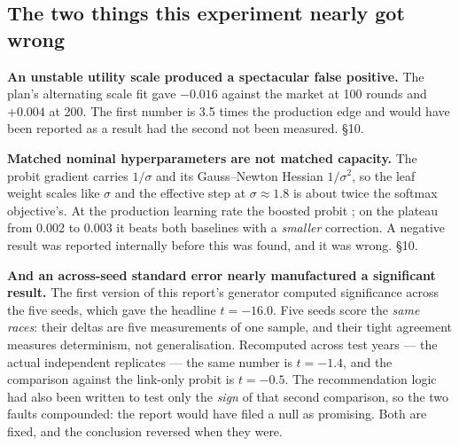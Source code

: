 \subsection*{The two things this experiment nearly got wrong}

\textbf{An unstable utility scale produced a spectacular false positive.} The plan's alternating scale fit gave $-0.016$ against the market at 100 rounds and $+0.004$ at 200. The first number is 3.5 times the production edge and would have been reported as a result had the second not been measured. §10.

\textbf{Matched nominal hyperparameters are not matched capacity.} The probit gradient carries $1/\sigma$ and its Gauss--Newton Hessian $1/\sigma^2$, so the leaf weight scales like $\sigma$ and the effective step at $\sigma\approx1.8$ is about twice the softmax objective's. At the production learning rate the boosted probit ; on the plateau from 0.002 to 0.003 it beats both baselines with a \emph{smaller} correction. A negative result was reported internally before this was found, and it was wrong. §10.

\textbf{And an across-seed standard error nearly manufactured a significant result.} The first version of this report's generator computed significance across the five seeds, which gave the headline $t=-16.0$. Five seeds score the \emph{same races}: their deltas are five measurements of one sample, and their tight agreement measures determinism, not generalisation. Recomputed across test years --- the actual independent replicates --- the same number is $t=-1.4$, and the comparison against the link-only probit is $t=-0.5$. The recommendation logic had also been written to test only the \emph{sign} of that second comparison, so the two faults compounded: the report would have filed a null as promising. Both are fixed, and the conclusion reversed when they were.

